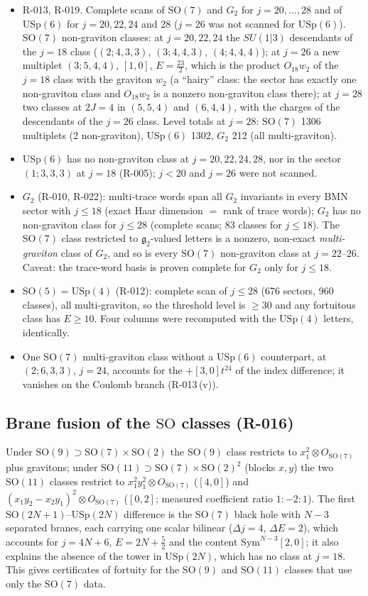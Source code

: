 \documentclass[11pt]{article}
\newcommand{\R}[1]{\textsf{R-0#1}}
\newcommand{\SO}{\mathrm{SO}}
\newcommand{\USp}{\mathrm{USp}}
\newcommand{\Gtwo}{G_2}
\begin{document}
\begin{itemize}
\item \R{13}, \R{19}. Complete scans of $\SO(7)$ and $\Gtwo$ for $j=20,\dots,28$ and of $\USp(6)$ for $j=20,22,24$ and
$28$ ($j=26$ was not scanned for $\USp(6)$).
$\SO(7)$ non-graviton classes: at $j=20,22,24$ the $SU(1|3)$ descendants of the $j=18$ class
($(2;4,3,3)$, $(3;4,4,3)$, $(4;4,4,4)$); at $j=26$ a new multiplet $(3;5,4,4)$, $[1,0]$, $E=\tfrac{23}{2}$, which is
the product $O_{18}w_2$ of the $j=18$ class with the graviton $w_2$ (a ``hairy'' class: the sector has exactly one
non-graviton class and $O_{18}w_2$ is a nonzero non-graviton class there); at $j=28$ two classes at $2J=4$ in
$(5,5,4)$ and $(6,4,4)$, with the charges of the descendants of the $j=26$ class. Level totals at $j=28$: $\SO(7)$ 1306
multiplets (2 non-graviton), $\USp(6)$ 1302, $\Gtwo$ 212 (all multi-graviton).
\item $\USp(6)$ has no non-graviton class at $j=20,22,24,28$, nor in the sector $(1;3,3,3)$ at $j=18$ (\R{05});
$j<20$ and $j=26$ were not scanned.
\item $\Gtwo$ (\R{10}, \R{22}): multi-trace words span all $\Gtwo$ invariants in every BMN sector with $j\le18$
(exact Haar dimension $=$ rank of trace words); $\Gtwo$ has no non-graviton class for $j\le28$ (complete scans; 83
classes for $j\le18$). The $\SO(7)$ class restricted to $\mathfrak g_2$-valued letters is a nonzero, non-exact
\emph{multi-graviton} class of $\Gtwo$, and so is every $\SO(7)$ non-graviton class at $j=22$--$26$. Caveat: the
trace-word basis is proven complete for $\Gtwo$ only for $j\le18$.
\item $\SO(5)=\USp(4)$ (\R{12}): complete scan of $j\le28$ (676 sectors, 960 classes), all multi-graviton, so the
threshold level is $\ge30$ and any fortuitous class has $E\ge10$. Four columns were recomputed with the $\USp(4)$
letters, identically.
\item One $\SO(7)$ multi-graviton class without a $\USp(6)$ counterpart, at $(2;6,3,3)$, $j=24$, accounts for the
$+[3,0]t^{24}$ of the index difference; it vanishes on the Coulomb branch (\R{13}\,(v)).
\end{itemize}

\subsection{Brane fusion of the $\SO$ classes (\R{16})}

Under $\SO(9)\supset\SO(7)\times\SO(2)$ the $\SO(9)$ class restricts to $x_1^2\otimes O_{\SO(7)}$ plus gravitons;
under $\SO(11)\supset\SO(7)\times\SO(2)^2$ (blocks $x,y$) the two $\SO(11)$ classes restrict to
$x_1^2y_1^2\otimes O_{\SO(7)}$ ($[4,0]$) and $(x_1y_2-x_2y_1)^2\otimes O_{\SO(7)}$ ($[0,2]$; measured coefficient ratio
$1:-2:1$). The first $\SO(2N+1)$--$\USp(2N)$ difference is the $\SO(7)$ black hole with $N-3$ separated branes, each
carrying one scalar bilinear ($\Delta j=4$, $\Delta E=2$), which accounts for $j=4N+6$, $E=2N+\tfrac52$ and the content
$\mathrm{Sym}^{N-3}[2,0]$; it also explains the absence of the tower in $\USp(2N)$, which has no class at $j=18$. This
gives certificates of fortuity for the $\SO(9)$ and $\SO(11)$ classes that use only the $\SO(7)$ data.
\end{document}
